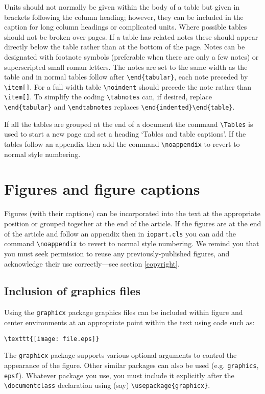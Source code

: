 \documentclass[12pt]{iopart}
\begin{document}
Units should not normally be given within the body of a table but 
given in brackets following the column heading; however, they can be 
included in the caption for long column headings or complicated units. 
Where possible tables should not be broken over pages. 
If a table has related notes these should appear directly below the table
rather than at the bottom of the page. Notes can be designated with
footnote symbols (preferable when there are only a few notes) or
superscripted small roman letters. The notes are set to the same width as
the table and in normal tables follow after \verb"\end{tabular}", each
note preceded by \verb"\item[]". For a full width table \verb"\noindent"
should precede the note rather than \verb"\item[]". To simplify the coding 
\verb"\tabnotes" can, if desired, replace \verb"\end{tabular}" and 
\verb"\endtabnotes" replaces
\verb"\end{indented}\end{table}".

If all the tables are grouped at the end of a document
the command \verb"\Tables" is used to start a new page and 
set a heading `Tables and table captions'. If the tables follow an appendix then add the command \verb"\noappendix" to revert to normal style numbering.
  
\section{Figures and figure captions}

Figures (with their captions) can be incorporated into the text at the appropriate position or grouped together
at the end of the article. If the figures are at the end of the article and follow an appendix then in \verb"iopart.cls" you can add the command \verb"\noappendix" to revert to normal style numbering.  We remind you that you must seek permission
to reuse any previously-published figures, and acknowledge their use correctly---see section \ref{copyright}.

\subsection{Inclusion of graphics files\label{figinc}}
Using the \verb"graphicx" package graphics files can 
be included within figure and center environments at an 
appropriate point within the text using code such as:
\small\begin{verbatim}
\texttt{[image: file.eps]}
\end{verbatim}\normalsize
The \verb"graphicx" package supports various optional arguments
to control the appearance of the figure. Other similar 
packages can also be used (e.g. \verb"graphics", \verb"epsf").   Whatever package you use,
you must include it explicitly after the \verb"\documentclass" declaration using (say)
\verb"\usepackage{graphicx}".
\end{document}
